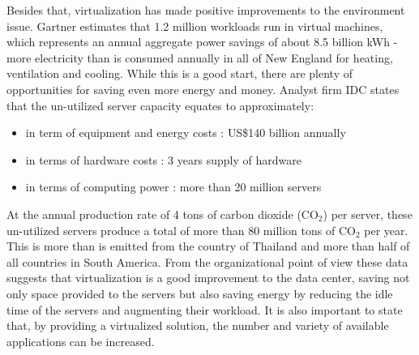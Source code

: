                 Besides that, virtualization has made positive improvements to the environment issue. Gartner \cite{GartnetStamford07} estimates that 1.2 million workloads run in virtual machines, which represents an annual aggregate power savings of about 8.5 billion kWh - more electricity than is consumed annually in all of New England for heating, ventilation and cooling. While this is a good start, there are plenty of opportunities for saving even more energy and money. Analyst firm IDC \cite{IDCDoc07} states that the un-utilized server capacity equates to approximately:
                \begin{itemize}
                    \item in term of equipment and energy costs : US\$140 billion annually
                    \item in terms of hardware costs : 3 years supply of hardware
                    \item in terms of computing power : more than 20 million servers 
                \end{itemize}
                At the annual production rate of 4 tons of carbon dioxide (CO$_{2}$) per server, these un-utilized servers produce a total of more than 80 million tons of CO$_{2}$ per year. This is more than is emitted from the country of Thailand and more than half of all countries in South America. From the organizational point of view these data suggests that virtualization is a good improvement to the data center, saving not only space provided to the servers but also saving energy by reducing the idle time of the servers and augmenting their workload. It is also important to state that, by providing a virtualized solution, the number and variety of available applications can be increased.
                

